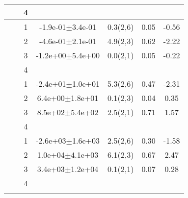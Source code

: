 \begin{longtable}{llccccS[table-format=-2.2, table-space-text-post = {***}]}
   &  & 4 &  &  &  &  \\ 
   \midrule
{} & {} & 1 & -1.9e-01$\pm$3.4e-01 & 0.3(2,6) & 0.05 & -0.56 \\ 
   &  & 2 & -4.6e-01$\pm$2.1e-01 & 4.9(2,3) & 0.62 & -2.22 \\ 
   &  & 3 & -1.2e+00$\pm$5.4e+00 & 0.0(2,1) & 0.05 & -0.22 \\ 
   &  & 4 &  &  &  &  \\ 
   \midrule
{} & {} & 1 & -2.4e+01$\pm$1.0e+01 & 5.3(2,6) & 0.47 & -2.31 \\ 
   &  & 2 &  6.4e+00$\pm$1.8e+01 & 0.1(2,3) & 0.04 & 0.35 \\ 
   &  & 3 &  8.5e+02$\pm$5.4e+02 & 2.5(2,1) & 0.71 & 1.57 \\ 
   &  & 4 &  &  &  &  \\ 
   \midrule
{} & {} & 1 & -2.6e+03$\pm$1.6e+03 & 2.5(2,6) & 0.30 & -1.58 \\ 
   &  & 2 &  1.0e+04$\pm$4.1e+03 & 6.1(2,3) & 0.67 & 2.47 \\ 
   &  & 3 &  3.4e+03$\pm$1.2e+04 & 0.1(2,1) & 0.07 & 0.28 \\ 
   &  & 4 &  &  &  &  \\ 
   \bottomrule
\label{bivar_lm_summ}
\end{longtable}

